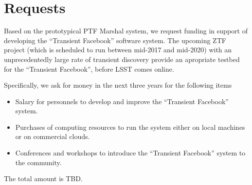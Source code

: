 \documentclass[11pt]{article}
\begin{document}
\section{Requests}
\label{sec:request}

Based on the prototypical PTF Marshal system, we request funding in
support of developing the ``Transient Facebook'' software system. The
upcoming ZTF project (which is scheduled to run between mid-2017 and
mid-2020) with an unprecedentedly large rate of transient discovery
provide an apropriate testbed for the ``Transient Facebook'', before
LSST comes online.

Specifically, we ask for money in the next three years for the following items
\begin{itemize}
\item Salary for personnels to develop and improve the ``Transient Facebook''
  system.
\item Purchases of computing resources to run the system either on local machines or
  on commercial clouds. 
\item Conferences and workshops to introduce the ``Transient
  Facebook'' system to the community.
\end{itemize}
The total amount is TBD. 


\end{document}
